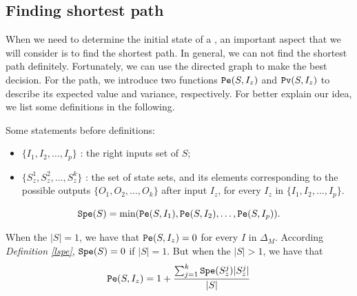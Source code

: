 \subsection{Finding shortest path}
When we need to determine the initial state of a \BCN, an important aspect that we will consider is to find the shortest path. In general, we can not find the shortest path definitely.  Fortunately, we can use the directed graph to make the best decision. For the path, we introduce two functions $\Pe(S, I_z)$ and ${\tt Pv}(S, I_z)$ to describe its expected value and variance, respectively. For better explain our idea, we list some definitions in the following.



Some statements before definitions:
\begin{itemize}
  \item $\{I_1,I_2,\ldots, I_p\}$ : the right inputs set of $S$;
  \item $\{S_z^1,S_z^2,\ldots, S_z^k\}$ : the set of state sets, and its elements corresponding to the possible outputs $\{O_1,O_2,\ldots,O_k\}$ after input $I_z$, for every $I_z$ in $\{I_1,I_2,\ldots, I_p\}$.
\end{itemize} 
\begin{definition}[$\Spe(S)$] \label{lspe}
 \[{\tt Spe}(S)= \min({\tt Pe}(S, I_1),{\tt Pe}(S, I_2),\ldots,{\tt Pe}(S, I_p)).\] 
\end{definition}

\begin{definition}[$\Pe(S, I_z)$] 
When the $|S|=1$, we have that
${\tt Pe}(S, I_z)=0$  for every $I$ in $\Delta_M$. According {\em Definition \ref{lspe}}, ${\tt Spe}(S)=0$ if $|S|=1$. But when the $|S|>1$, 
we have that  
\[{\tt Pe}(S, I_z)=1 +\frac{\sum_{j=1}^k {\tt Spe}(S_z^j)|S_z^j|}{ |S|}\] 
\end{definition}

